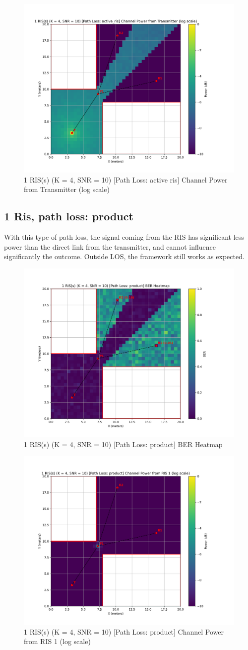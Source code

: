 \begin{figure}[H]
  \centering
  \includegraphics[width=0.45\linewidth]{imgs/heatmap-simulations/1 RIS(s) (K = 4, SNR = 10) [Path Loss_ active_ris] Channel Power from Transmitter (log scale).png}
  \caption{1 RIS(s) (K = 4, SNR = 10) [Path Loss: active ris] Channel Power from Transmitter (log scale)}
\end{figure}

\subsection*{1 Ris, path loss: product}

With this type of path loss, the signal coming from the RIS has significant less power than the direct link from the transmitter, and cannot influence significantly the outcome. Outside LOS, the framework still works as expected.

\begin{figure}[H]
  \centering
  \includegraphics[width=0.45\linewidth]{imgs/heatmap-simulations/1 RIS(s) (K = 4, SNR = 10) [Path Loss_ product] BER Heatmap.png}
  \caption{1 RIS(s) (K = 4, SNR = 10) [Path Loss: product] BER Heatmap}
\end{figure}

\begin{figure}[H]
  \centering
  \includegraphics[width=0.45\linewidth]{imgs/heatmap-simulations/1 RIS(s) (K = 4, SNR = 10) [Path Loss_ product] Channel Power from RIS 1 (log scale).png}
  \caption{1 RIS(s) (K = 4, SNR = 10) [Path Loss: product] Channel Power from RIS 1 (log scale)}
\end{figure}

